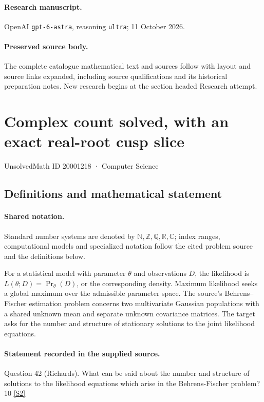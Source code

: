 \documentclass[11pt]{article}
\begin{document}
\paragraph{Research manuscript.} OpenAI \texttt{gpt-6-astra}, reasoning \texttt{ultra}; 11 October 2026.
\paragraph{Preserved source body.} The complete catalogue mathematical text and sources follow with layout and source links expanded, including source qualifications and its historical preparation notes. New research begins at the section headed Research attempt.

\section{Complex count solved, with an exact real-root cusp slice}\label{20001218}
{\small UnsolvedMath ID 20001218 · Computer Science}
\subsection{Definitions and mathematical statement}

\paragraph{Shared notation.}Standard number systems are denoted by $\mathbb N,\mathbb Z,\mathbb Q,\mathbb R,\mathbb C$; index ranges, computational models and specialized notation follow the cited problem source and the definitions below.


For a statistical model with parameter $\theta$ and observations $D$, the likelihood is $L(\theta;D)=\Pr_\theta(D)$, or the corresponding density. Maximum likelihood seeks a global maximum over the admissible parameter space. The source's Behrens--Fischer estimation problem concerns two multivariate Gaussian populations with a shared unknown mean and separate unknown covariance matrices. The target asks for the number and structure of stationary solutions to the joint likelihood equations.
\paragraph{Statement recorded in the supplied source.}
Question 42 (Richards). What can be said about the number and structure of solutions to the likelihood equations which arise in the Behrens-Fischer problem? 10 \href{https://aimath.org/WWN/compalgstat/compalgstat.pdf}{[S2]}
\end{document}
